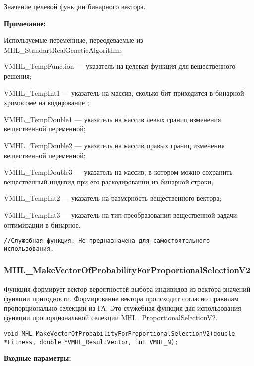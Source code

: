 \documentclass[a4paper,12pt]{article}
\begin{document}
Значение целевой функции бинарного вектора.
 
\textbf{Примечание:}

Используемые переменные, переодеваемые из MHL\_StandartRealGeneticAlgorithm:
 
VMHL\_TempFunction --- указатель на целевая функция для вещественного решения;
 
VMHL\_TempInt1 --- указатель на массив, сколько бит приходится в бинарной хромосоме на кодирование ;
 
VMHL\_TempDouble1 --- указатель на массив левых границ изменения вещественной переменной;
 
VMHL\_TempDouble2 --- указатель на массив правых границ изменения вещественной переменной;
 
VMHL\_TempDouble3 --- указатель на массив, в котором можно сохранить вещественный индивид при его раскодировании из бинарной строки;
 
VMHL\_TempInt2 --- указатель на размерность вещественного вектора;
 
VMHL\_TempInt3 --- указатель на тип преобразования вещественной задачи оптимизации в бинарное.



\begin{lstlisting}[label=code_use_MHL_BinaryFitnessFunction,caption=Пример использования]
//Служебная функция. Не предназначена для самостоятельного использования.
\end{lstlisting}

\subsubsection{MHL\_MakeVectorOfProbabilityForProportionalSelectionV2}\label{MHL_MakeVectorOfProbabilityForProportionalSelectionV2}

Функция формирует вектор вероятностей выбора индивидов из вектора значений функции пригодности. Формирование вектора происходит согласно правилам пропорционально селекции из ГА. Это служебная функция для использования функции пропорциональной селекции MHL\_ProportionalSelectionV2.


\begin{lstlisting}[label=code_syntax_MHL_MakeVectorOfProbabilityForProportionalSelectionV2,caption=Синтаксис]
void MHL_MakeVectorOfProbabilityForProportionalSelectionV2(double *Fitness, double *VMHL_ResultVector, int VMHL_N);
\end{lstlisting}

\textbf{Входные параметры:}
 
\end{document}
